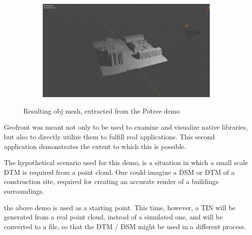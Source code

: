 \begin{figure}
  \begin{subfigure}[b]{0.90\linewidth}
    \centering
    \includegraphics[width=\linewidth]{potree-7.PNG}
  \end{subfigure}%
  \caption{Resulting obj mesh, extracted from the Potree demo}
  \label{fig:potree-result}
\end{figure}

Geofront was meant not only to be used to examine and visualize native libraries, but also to directly utilize them to fulfill real applications.
This second application demonstrates the extent to which this is possible. 

The hypothetical scenario used for this demo, is a situation in which a small scale \ac{DTM} is required from a point cloud. 
One could imagine a \ac{DSM} or \ac{DTM} of a construction site, required for creating an accurate render of a buildings surroundings. 

the above  demo is used as a starting point. 
This time, however, a \ac{TIN} will be generated from a real point cloud, instead of a simulated one, and will be converted to a  file, so that the DTM / DSM might be used in a different process. 

